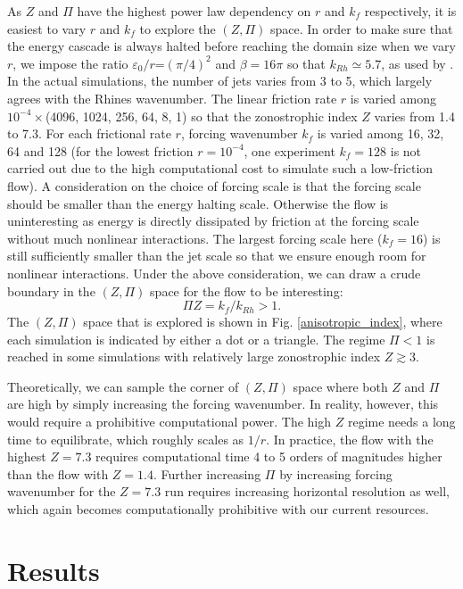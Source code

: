 \documentclass{ametsoc}
\begin{document}
As $Z$ and $\Pi$ have the highest power law dependency on $r$ and
$k_{f}$ respectively, it is easiest to vary $r$ and $k_{f}$ to
explore the $(Z,\Pi)$ space. In order to make sure that the energy cascade is
always halted before reaching the domain size when we vary $r$, we impose
the ratio $\varepsilon_{0}/r$=$(\pi/4)^{2}$ and $\beta=16\pi$ so
that $k_{Rh}\simeq5.7$, as used by \citet{Scott2012}. In
the actual simulations, the number of jets varies from 3 to 5, which
largely agrees with the Rhines wavenumber. The linear friction rate
$r$ is varied among $10^{-4}\times$(4096, 1024, 256, 64, 8, 1) so
that the zonostrophic index $Z$ varies from 1.4 to 7.3. For each frictional
rate $r$, forcing wavenumber $k_{f}$ is varied among 16, 32, 64
and 128 (for the lowest friction $r=10^{-4}$, one experiment $k_{f}=128$
is not carried out due to the high computational cost to simulate
such a low-friction flow). A consideration
on the choice of forcing scale is that the forcing scale should be
smaller than the energy halting scale. Otherwise the flow is
uninteresting as energy is directly dissipated by friction at the
forcing scale without much nonlinear interactions.
The largest forcing scale here ($k_{f}=16$) is
still sufficiently smaller than the jet scale so that we ensure
enough room for nonlinear interactions. Under the above consideration,
we can draw a crude boundary in the $(Z,\Pi)$ space
for the flow to be interesting:
\begin{equation}
\Pi Z=k_{f}/k_{Rh}>1.\label{eq:PIxZ>1}
\end{equation}
The $(Z,\Pi)$ space that is explored is shown in Fig. \ref{anisotropic_index},
where each simulation is indicated by either a dot or a triangle. The
regime $\Pi<1$ is reached in some simulations with relatively large
zonostrophic index $Z\apprge3$. 

Theoretically, we can sample the corner of $(Z,\Pi)$ space where
both $Z$ and $\Pi$ are high by simply increasing the forcing wavenumber.
In reality, however, this would require a prohibitive computational
power. The high $Z$ regime needs a long time to equilibrate, which
roughly scales as $1/r$. In practice, the flow with the
highest $Z=7.3$ requires computational time 4 to 5 orders of magnitudes
higher than the flow with $Z=1.4$. Further increasing $\Pi$ by increasing
forcing wavenumber for the $Z=7.3$ run requires increasing horizontal
resolution as well, which again becomes computationally prohibitive with
our current resources.


\section{Results}
\end{document}
